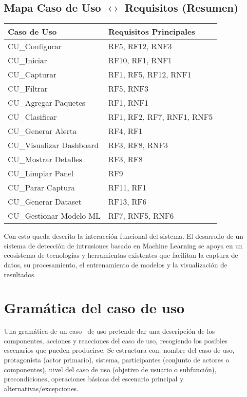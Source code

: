 \subsection{Mapa Caso de Uso $\leftrightarrow$ Requisitos (Resumen)}
\begin{center}
\begin{tabular}{p{3.2cm} p{8.5cm}}
\textbf{Caso de Uso} & \textbf{Requisitos Principales}\\\hline
CU\_Configurar & RF5, RF12, RNF3 \\
CU\_Iniciar & RF10, RF1, RNF1 \\
CU\_Capturar & RF1, RF5, RF12, RNF1 \\
CU\_Filtrar & RF5, RNF3 \\
CU\_Agregar Paquetes & RF1, RNF1 \\
CU\_Clasificar & RF1, RF2, RF7, RNF1, RNF5 \\
CU\_Generar Alerta & RF4, RF1 \\
CU\_Visualizar Dashboard & RF3, RF8, RNF3 \\
CU\_Mostrar Detalles & RF3, RF8 \\
CU\_Limpiar Panel & RF9 \\
CU\_Parar Captura & RF11, RF1 \\
CU\_Generar Dataset & RF13, RF6 \\
CU\_Gestionar Modelo ML & RF7, RNF5, RNF6 \\
\end{tabular}
\end{center}

\bigskip
Con esto queda descrita la interacción funcional del sistema.
El desarrollo de un sistema de detección de intrusiones basado en Machine Learning se apoya en un ecosistema de tecnologías y herramientas existentes que facilitan la captura de datos, su procesamiento, el entrenamiento de modelos y la visualización de resultados.


\section{Gramática del caso de uso}

Una gramática de un caso~\cite{cockburn2000writing} de uso pretende dar una descripción de los componentes, acciones y reacciones del caso de uso, recogiendo los posibles escenarios que pueden producirse. Se estructura con: nombre del caso de uso, protagonista (actor primario), sistema, participantes (conjunto de actores o componentes), nivel del caso de uso (objetivo de usuario o subfunción), precondiciones, operaciones básicas del escenario principal y alternativas/excepciones.

